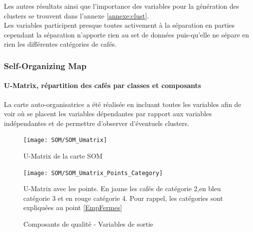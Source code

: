 \noindent Les autres résultats ainsi que l'importance des variables pour la génération des clusters se trouvent dans l'annexe \ref{annexe:clust}.\\


\noindent Les variables participent presque toutes activement à la séparation en parties cependant la séparation n'apporte rien au set de données puis-qu'elle ne sépare en rien les différentes catégories de cafés.



\newpage
\subsubsection{Self-Organizing Map}\label{SOM}


\paragraph{U-Matrix, répartition des cafés par classes et composants} 
La carte auto-organisatrice a été réalisée en incluant toutes les variables afin de voir où se placent les variables dépendantes par rapport aux variables indépendantes et de permettre d'observer d'éventuels clusters. 


\begin{figure}[H]
	\centering
	\texttt{[image: SOM/SOM\_Umatrix]}
	\caption{U-Matrix de la carte SOM}
	\label{}
\end{figure}

\begin{figure}[H]
	\centering
	\texttt{[image: SOM/SOM\_Umatrix\_Points\_Category]}
	\caption{\label{umatrix_cat}U-Matrix avec les points. En jaune les cafés de catégorie 2,en bleu catégorie 3 et en rouge catégorie 4. Pour rappel, les catégories sont expliquées au point \ref{EmpFermes}}
\end{figure}


\begin{figure}[H]
	\caption{Composants de qualité - Variables de sortie}
	\centering
		\hfill
		\hfill
		\newline
		\hfill
		\hfill
		\newline
		\hfill
		\hfill
		\newline
		\centering
		\hfill
\end{figure}




